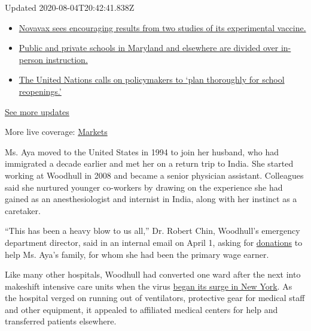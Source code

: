 Updated 2020-08-04T20:42:41.838Z

\begin{itemize}
\tightlist
\item
  \href{https://www.nytimes.com/2020/08/04/world/coronavirus-cases.html?action=click\&pgtype=Article\&state=default\&region=MAIN_CONTENT_1\&context=storylines_live_updates\#link-1228a480}{Novavax
  sees encouraging results from two studies of its experimental
  vaccine.}
\item
  \href{https://www.nytimes.com/2020/08/04/world/coronavirus-cases.html?action=click\&pgtype=Article\&state=default\&region=MAIN_CONTENT_1\&context=storylines_live_updates\#link-4825b93}{Public
  and private schools in Maryland and elsewhere are divided over
  in-person instruction.}
\item
  \href{https://www.nytimes.com/2020/08/04/world/coronavirus-cases.html?action=click\&pgtype=Article\&state=default\&region=MAIN_CONTENT_1\&context=storylines_live_updates\#link-50f7386d}{The
  United Nations calls on policymakers to `plan thoroughly for school
  reopenings.'}
\end{itemize}

\href{https://www.nytimes.com/2020/08/04/world/coronavirus-cases.html?action=click\&pgtype=Article\&state=default\&region=MAIN_CONTENT_1\&context=storylines_live_updates}{See
more updates}

More live coverage:
\href{https://www.nytimes.com/live/2020/08/04/business/stock-market-today-coronavirus?action=click\&pgtype=Article\&state=default\&region=MAIN_CONTENT_1\&context=storylines_live_updates}{Markets}

Ms. Aya moved to the United States in 1994 to join her husband, who had
immigrated a decade earlier and met her on a return trip to India. She
started working at Woodhull in 2008 and became a senior physician
assistant. Colleagues said she nurtured younger co-workers by drawing on
the experience she had gained as an anesthesiologist and internist in
India, along with her instinct as a caretaker.

``This has been a heavy blow to us all,'' Dr. Robert Chin, Woodhull's
emergency department director, said in an internal email on April 1,
asking for
\href{https://www.gofundme.com/f/in-memory-of-madhvi-aya?utm_source=customer\&utm_medium=email\&utm_campaign=m_pd+share-sheet}{donations}
to help Ms. Aya's family, for whom she had been the primary wage earner.

Like many other hospitals, Woodhull had converted one ward after the
next into makeshift intensive care units when the virus
\href{https://www.nytimes.com/2020/03/20/nyregion/ny-coronavirus-hospitals.html?searchResultPosition=3}{began
its surge in New York}. As the hospital verged on running out of
ventilators, protective gear for medical staff and other equipment, it
appealed to affiliated medical centers for help and transferred patients
elsewhere.

